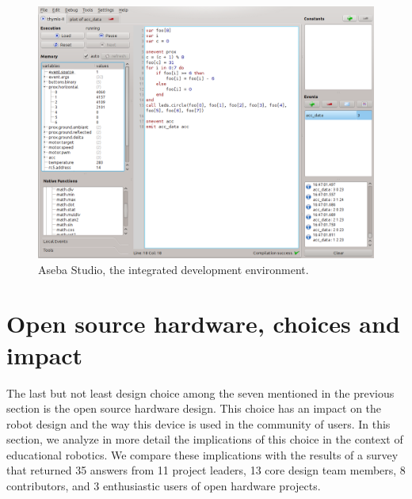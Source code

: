 \documentclass[letterpaper, 10 pt, conference]{ieeeconf}  %
\begin{document}
\begin{figure}
\centering
\includegraphics[width=\columnwidth]{figures/aseba-studio}
\caption{Aseba Studio, the integrated development environment.}
\label{fig:aseba-studio}
\end{figure}

\section{Open source hardware, choices and impact}

The last but not least design choice among the seven mentioned in the previous section is the open source hardware design.
This choice has an impact on the robot design and the way this device is used in the community of users. 
In this section, we analyze in more detail the implications of this choice in the context of educational robotics.
We compare these implications with the results of a survey that returned 35 answers from 11 project leaders, 13 core design team members, 8 contributors, and 3 enthusiastic users of open hardware projects.
\end{document}
